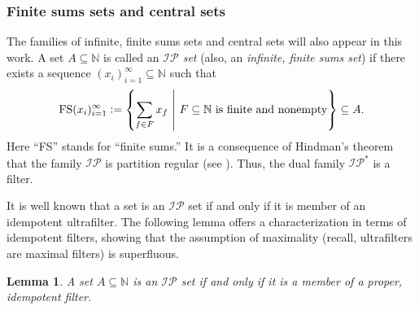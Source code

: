 \documentclass[letter,11pt]{article}
\theoremstyle{plain}
\newtheorem{lemma}[theorem]{Lemma}
\theoremstyle{definition}
\theoremstyle{plain}
\theoremstyle{plain}
\numberwithin{equation}{section}
\newcommand{\N}{\mathbb{N}}
\newcommand{\defeq}{\vcentcolon=}
\newcommand{\IP}{\mathcal{IP}}
\newcommand{\FS}{\text{FS}}
\begin{document}
\subsubsection{Finite sums sets and central sets}
\label{sec_ip_and_central_sets}

The families of infinite, finite sums sets and central sets will also appear in this work.  A set $A \subseteq \N$ is called an \emph{$\IP$ set} (also, an \emph{infinite, finite sums set}) if there exists a sequence $(x_i)_{i=1}^\infty \subseteq \N$ such that
\[\FS(x_i)_{i=1}^\infty \defeq \left\{ \sum_{f \in F} x_f \ \middle | \ F \subseteq \N \text{ is finite and nonempty} \right\} \subseteq A.\]
Here ``FS'' stands for ``finite sums.''  It is a consequence of Hindman's theorem \cite{hindman_1974} that the family $\IP$ is partition regular (see \cite[Lemma 2.1]{bergelson_hindman_1993}). Thus, the dual family $\IP^*$ is a filter.

It is well known \cite[Thm. 5.12]{hindman_strauss_book_2012} that a set is an $\IP$ set if and only if it is member of an idempotent ultrafilter.  The following lemma offers a characterization in terms of idempotent filters, showing that the assumption of maximality (recall, ultrafilters are maximal filters) is superfluous.

\begin{lemma}
\label{lemma_ip_set_iff_contained_in_prop_idemp_filter}
    A set $A \subseteq \N$ is an $\IP$ set if and only if it is a member of a proper, idempotent filter.
\end{lemma}
\end{document}
